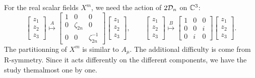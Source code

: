             For the real scalar fields $X^m$, we need the action of $2\mathcal{D}_n$ on $\mathbb{C}^3$:
            \begin{equation}
                \begin{bmatrix}
                    z_1\\z_2\\z_3
                \end{bmatrix}\overset{A}{\longmapsto}
                \begin{bmatrix}
                    1 & 0 & 0 \\
                    0 & \zeta_{2n} & 0 \\
                    0 & 0 & \zeta^{-1}_{2n}
                \end{bmatrix}
                \begin{bmatrix}
                    z_1\\z_2\\z_3
                \end{bmatrix},\qquad
                \begin{bmatrix}
                    z_1\\z_2\\z_3
                \end{bmatrix}\overset{B}{\longmapsto}
                \begin{bmatrix}
                    1 & 0 & 0 \\
                    0 & 0 & i \\
                    0 & i & 0
                \end{bmatrix}
                \begin{bmatrix}
                    z_1\\z_2\\z_3
                \end{bmatrix}.\label{eq:RsymDn}
            \end{equation}
            The partitionning of $X^m$ is similar to $A_\mu$. The additional difficulty is come from R-symmetry. Since it acts differently on the different components, we have the study themalmost one by one.

